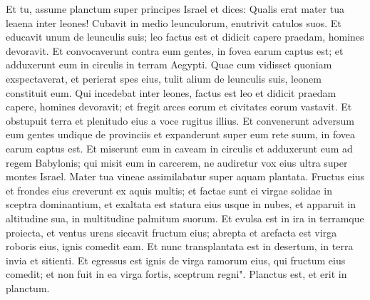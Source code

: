 \begin{biblechapter}  
\verse Et tu, assume planctum super principes Israel 
\verse et dices: Qualis erat mater tua leaena inter leones! Cubavit in medio leunculorum, enutrivit catulos suos. 
\verse Et educavit unum de leunculis suis; leo factus est et didicit capere praedam, homines devoravit. 
\verse Et convocaverunt contra eum gentes, in fovea earum captus est; et adduxerunt eum in circulis in terram Aegypti. 
\verse Quae cum vidisset quoniam exspectaverat, et perierat spes eius, tulit alium de leunculis suis, leonem constituit eum. 
\verse Qui incedebat inter leones, factus est leo et didicit praedam capere, homines devoravit; 
\verse et fregit arces eorum et civitates eorum vastavit. Et obstupuit terra et plenitudo eius a voce rugitus illius. 
\verse Et convenerunt adversum eum gentes undique de provinciis et expanderunt super eum rete suum, in fovea earum captus est. 
\verse Et miserunt eum in caveam in circulis et adduxerunt eum ad regem Babylonis; qui misit eum in carcerem, ne audiretur vox eius ultra super montes Israel. 
\verse Mater tua vineae assimilabatur super aquam plantata. Fructus eius et frondes eius creverunt ex aquis multis; 
\verse et factae sunt ei virgae solidae in sceptra dominantium, et exaltata est statura eius usque in nubes, et apparuit in altitudine sua, in multitudine palmitum suorum. 
\verse Et evulsa est in ira in terramque proiecta, et ventus urens siccavit fructum eius; abrepta et arefacta est virga roboris eius, ignis comedit eam. 
\verse Et nunc transplantata est in desertum, in terra invia et sitienti. 
\verse Et egressus est ignis de virga ramorum eius, qui fructum eius comedit; et non fuit in ea virga fortis, sceptrum regni". Planctus est, et erit in planctum. 
\end{biblechapter}

